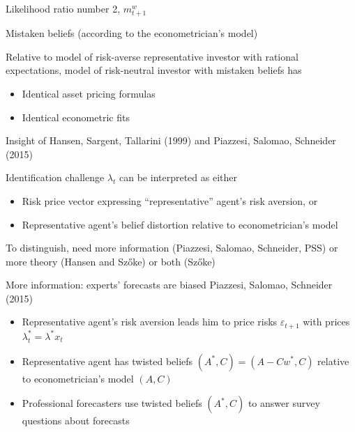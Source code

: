 \documentclass{beamer}
\theoremstyle{Definition}
\begin{document}
\begin{frame}{Likelihood ratio number 2,  $m_{t+1}^w$}

Mistaken beliefs (according to the econometrician's model)

\bigskip
\bigskip

Relative to model of risk-averse representative investor with rational expectations, model of
risk-neutral  investor with mistaken beliefs has 

\begin{itemize}
\item Identical asset pricing formulas  %
\item Identical econometric fits 
\end{itemize}


Insight of Hansen, Sargent, Tallarini (1999) and  Piazzesi, Salomao, Schneider (2015)

\end{frame}
\begin{frame}{Identification challenge}
$\lambda_t$ can be interpreted as either

\begin{itemize}
\item Risk price vector expressing ``representative'' agent's risk aversion, or
\item Representative agent's belief distortion relative to econometrician's model
\end{itemize}

To distinguish, need more information  (Piazzesi, Salomao, Schneider, PSS) or more theory (Hansen and Sz\H{o}ke) or both (Sz\H{o}ke)

\end{frame}



\begin{frame}{More information: experts' forecasts are biased}
Piazzesi, Salomao, Schneider (2015)

\begin{itemize}
\item Representative agent's risk aversion leads him to price risks $\varepsilon_{t+1}$ with prices $\lambda_t^* = \lambda^* x_t$
\item Representative agent has twisted beliefs $(A^*, C) = (A- C w^*, C)$  relative to econometrician's model $(A,C)$
\item Professional forecasters use  twisted beliefs $(A^*,C) $ to answer survey questions about forecasts %
\end{itemize}


\end{frame}
\end{document}
